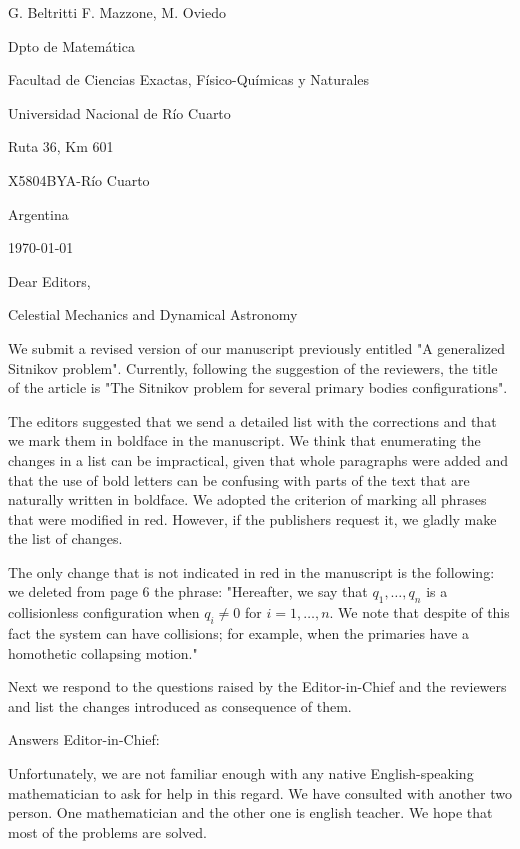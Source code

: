 \documentclass{article}
\begin{document}
\begin{flushright}
G. Beltritti
F. Mazzone,
M. Oviedo


Dpto de Matem\'atica

Facultad de Ciencias Exactas, F\'isico-Qu\'imicas y Naturales

Universidad Nacional de R\'io Cuarto

Ruta 36, Km 601

X5804BYA-R\'io Cuarto

Argentina
\end{flushright}

\today
\vspace{1cm}

Dear Editors,

Celestial Mechanics and Dynamical Astronomy

\vspace{.5cm}

We  submit a revised version of our manuscript previously entitled "A generalized Sitnikov problem". Currently, following the suggestion of the reviewers, the title of the article is  "The Sitnikov problem for several primary bodies configurations".


The editors suggested that we send a detailed list with the corrections and that we mark them in boldface in the manuscript. We think that enumerating the changes in a list can be impractical, given that whole paragraphs were added and that the use of bold letters can be confusing with parts of the text that are naturally written in boldface. We adopted the criterion of marking all phrases that were modified in red. However, if the publishers request it, we gladly make the list of changes.


The only change that is not indicated in red in the manuscript is the following: we deleted from page 6 the phrase: "Hereafter,  we say that   $q_1,\ldots,q_n$ is a collisionless configuration  when $q_i\neq 0$ for $i=1,\ldots,n$. We note that despite of this fact the system can have collisions; for example,  when the primaries have a homothetic collapsing motion."



Next we respond to the questions raised by the  Editor-in-Chief and the  reviewers and list the changes introduced as consequence of them.

Answers  Editor-in-Chief:

Unfortunately, we are not familiar enough with any native English-speaking mathematician  to ask for help in this regard.   We have consulted with another two person. One mathematician and the other one is english teacher. We hope that most of the problems are solved.
\end{document}
